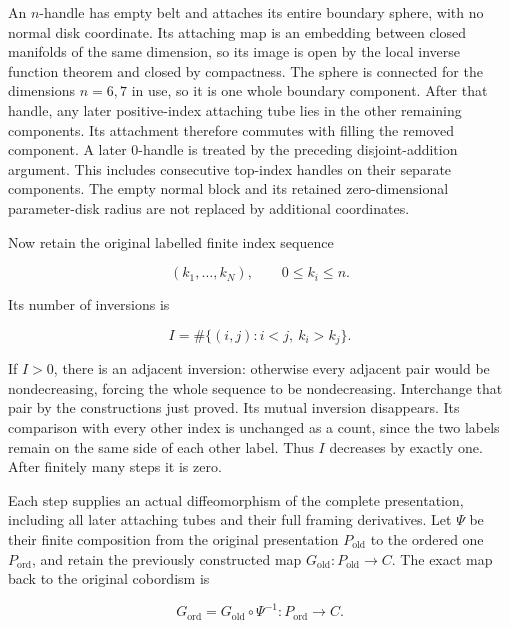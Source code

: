 An \(n\)-handle has empty belt and attaches its entire boundary sphere, with no normal disk coordinate. Its attaching map is an embedding between closed manifolds of the same dimension, so its image is open by the local inverse function theorem and closed by compactness. The sphere is connected for the dimensions \(n=6,7\) in use, so it is one whole boundary component. After that handle, any later positive-index attaching tube lies in the other remaining components. Its attachment therefore commutes with filling the removed component. A later \(0\)-handle is treated by the preceding disjoint-addition argument. This includes consecutive top-index handles on their separate components. The empty normal block and its retained zero-dimensional parameter-disk radius are not replaced by additional coordinates.

Now retain the original labelled finite index sequence

\begin{equation}
(k_1,\ldots,k_N),\qquad 0\leq k_i\leq n.
\label{courseIII:rearranging-the-original-framed-handles:eq:4.14}
\end{equation}

Its number of inversions is

\begin{equation}
I=\#\{(i,j):i<j,\ k_i>k_j\}.
\label{courseIII:rearranging-the-original-framed-handles:eq:4.15}
\end{equation}

If \(I>0\), there is an adjacent inversion: otherwise every adjacent pair would be nondecreasing, forcing the whole sequence to be nondecreasing. Interchange that pair by the constructions just proved. Its mutual inversion disappears. Its comparison with every other index is unchanged as a count, since the two labels remain on the same side of each other label. Thus \(I\) decreases by exactly one. After finitely many steps it is zero.

Each step supplies an actual diffeomorphism of the complete presentation, including all later attaching tubes and their full framing derivatives. Let \(\Psi\) be their finite composition from the original presentation \(P_{\mathrm{old}}\) to the ordered one \(P_{\mathrm{ord}}\), and retain the previously constructed map \(G_{\mathrm{old}}:P_{\mathrm{old}}\to C\). The exact map back to the original cobordism is

\begin{equation}
G_{\mathrm{ord}}
=G_{\mathrm{old}}\circ\Psi^{-1}:P_{\mathrm{ord}}\longrightarrow C.
\label{courseIII:rearranging-the-original-framed-handles:eq:4.16}
\end{equation}

